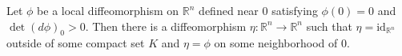 Let $\phi$ be a local diffeomorphism on $\mathbb{R}^n$ defined near $0$ satisfying $\phi(0) = 0$ and $\det(d\phi)_0 > 0$. Then there is a diffeomorphism $\eta: \mathbb{R}^n \to \mathbb{R}^n$ such that $\eta = \mathrm{id}_{\mathbb{R}^n}$ outside of some compact set $K$ and $\eta = \phi$ on some neighborhood of $0$.
